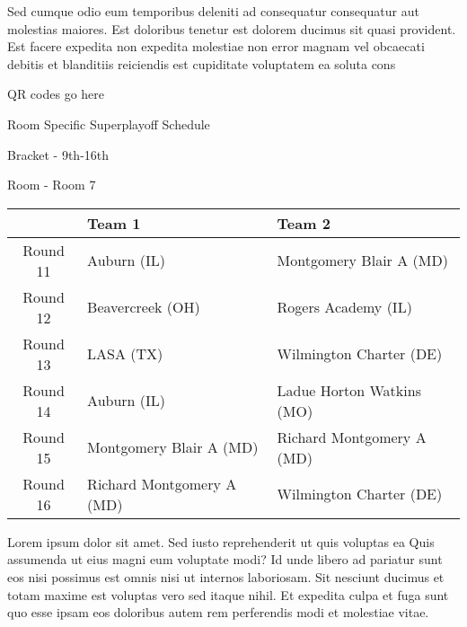 \documentclass{article}%
\begin{document}
\newline%
    Sed cumque odio eum temporibus deleniti ad consequatur consequatur aut molestias maiores. Est doloribus tenetur est dolorem ducimus sit quasi provident. Est facere expedita non expedita molestiae non error magnam vel obcaecati debitis et blanditiis reiciendis est cupiditate voluptatem ea soluta cons%
\vspace*{140pt}%
\begin{center}%
\begin{Huge}%
QR codes go here%
\end{Huge}%
\end{center}%
\newpage%
\begin{center}%
\begin{Huge}%
Room Specific Superplayoff Schedule%
\end{Huge}%
\vspace*{8pt}%
\linebreak%
\begin{Large}%
Bracket {-} 9th{-}16th%
\end{Large}%
\vspace*{8pt}%
\linebreak%
\vspace*{8pt}%
\begin{Large}%
Room {-} Room 7%
\end{Large}%
\end{center}%
%
\begin{tabularx}{\textwidth}{|c|Y|Y|}%
\hline%
&Team 1&Team 2\\%
\hline%
Round 11&Auburn (IL)&Montgomery Blair A (MD)\\%
Round 12&Beavercreek (OH)&Rogers Academy (IL)\\%
Round 13&LASA (TX)&Wilmington Charter (DE)\\%
Round 14&Auburn (IL)&Ladue Horton Watkins (MO)\\%
Round 15&Montgomery Blair A (MD)&Richard Montgomery A (MD)\\%
Round 16&Richard Montgomery A (MD)&Wilmington Charter (DE)\\%
\hline%
\end{tabularx}%
\vspace*{8pt}%
\newline%
    Lorem ipsum dolor sit amet. Sed iusto reprehenderit ut quis voluptas ea Quis assumenda ut eius magni eum voluptate modi? Id unde libero ad pariatur sunt eos nisi possimus est omnis nisi ut internos laboriosam. Sit nesciunt ducimus et totam maxime est voluptas vero sed itaque nihil. Et expedita culpa et fuga sunt quo esse ipsam eos doloribus autem rem perferendis modi et molestiae vitae.\newline%
\end{document}
